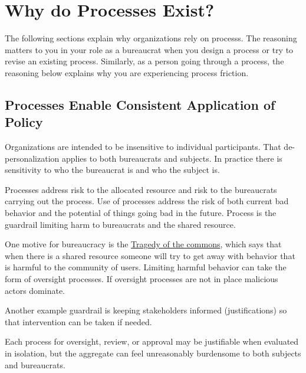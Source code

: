 \section{Why do Processes Exist?\label{sec:why-processes-exist}}


The following sections explain why organizations rely on \glspl{process}. The reasoning matters to you in your role as a bureaucrat when you design a process or try to revise an existing process. Similarly, as a person going through a process, the reasoning below explains why you are experiencing \gls{process friction}. 

\subsection*{Processes Enable Consistent Application of Policy}

Organizations are intended to be insensitive to individual participants. That de-personalization applies to both bureaucrats and subjects. In practice there is sensitivity to who the bureaucrat is and who the subject is. 

Processes address risk to the allocated resource and risk to the bureaucrats carrying out the process.
Use of processes address the risk of both current bad behavior and the potential of things going bad in the future. Process is the guardrail limiting harm to bureaucrats and the shared resource. 

One motive for bureaucracy is the \href{https://en.wikipedia.org/wiki/Tragedy_of_the_commons}{Tragedy of the commons}, 
which says that when there is a shared resource someone will try to get away with behavior that is harmful to the community of users. Limiting harmful behavior can take the form of oversight processes. If oversight processes are not in place malicious actors dominate.

Another example guardrail is keeping stakeholders informed (justifications) so that intervention can be taken if needed. 

Each process for oversight, review, or approval may be justifiable when evaluated in isolation, but the aggregate can feel unreasonably burdensome to both subjects and bureaucrats.





